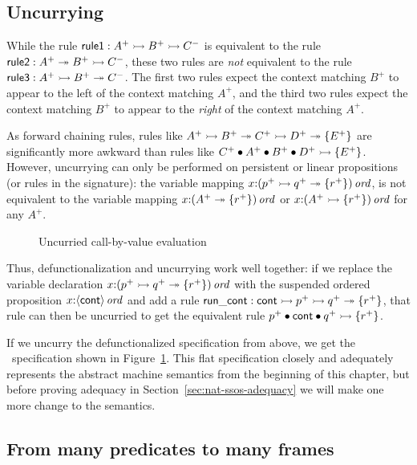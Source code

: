 \subsection{Uncurrying}
\label{sec:defunc-uncurry}

While the rule ${\sf rule1} : A^+ \rightarrowtail B^+ \rightarrowtail C^-$ is equivalent
to the rule ${\sf rule2} : A^+ \twoheadrightarrow B^+ \rightarrowtail C^-$, these two
rules are {\it not} equivalent to the rule ${\sf rule3} : A^+ \rightarrowtail
B^+ \twoheadrightarrow C^-$. The first two rules expect the context matching
$B^+$ to appear to the left of the context matching $A^+$, and the
third two rules expect the context matching $B^+$ to appear to the
{\it right} of the context matching $A^+$.

As forward chaining rules, rules like $A^+ \rightarrowtail B^+ \twoheadrightarrow C^+
\rightarrowtail D^+ \twoheadrightarrow \{ E^+ \}$ are significantly more awkward than
rules like $C^+ \mathbin{\bullet} A^+ \mathbin{\bullet} B^+ \mathbin{\bullet} D^+ \rightarrowtail \{ E^+
\}$. However, uncurrying can only be performed on persistent or linear
propositions (or rules in the signature): the variable mapping
$x{:}{(p^+ \rightarrowtail q^+ \twoheadrightarrow \{ r^+ \})}\,{{\it ord}}$, is not equivalent to the 
variable mapping
$x{:}{(A^+ \twoheadrightarrow \{ r^+ \})}\,{{\it ord}}$ or $x{:}{(A^+ \rightarrowtail \{ r^+ \})}\,{{\it ord}}$
for any $A^+$. 

\begin{figure}
\caption{Uncurried call-by-value evaluation}
\label{fig:cbv-uncurry}
\end{figure}

Thus, defunctionalization
and uncurrying work well together: if we replace the variable
declaration
$x{:}{(p^+ \rightarrowtail q^+ \twoheadrightarrow \{ r^+ \})}\,{{\it ord}}$ with the suspended
ordered proposition $x{:}{\langle {\sf cont} \rangle}\,{{\it ord}}$ and add a rule
${\sf run\_cont} : {\sf cont} \rightarrowtail p^+ \rightarrowtail q^+ \twoheadrightarrow \{ r^+ \}$, that rule can 
then be uncurried to get the equivalent rule
$p^+ \mathbin{\bullet} {\sf cont} \mathbin{\bullet} q^+ \rightarrowtail \{ r^+ \}$.

If we uncurry the defunctionalized specification from above, we get
the \sls~specification shown in Figure~\ref{fig:cbv-uncurry}. This
flat specification closely and adequately represents the abstract
machine semantics from the beginning of this chapter, but before
proving adequacy in Section~\ref{sec:nat-ssos-adequacy} we
will make one more change to the semantics.

\subsection{From many predicates to many frames}
\label{sec:defunc-type}

